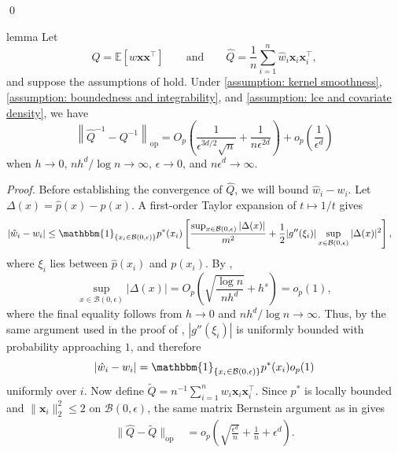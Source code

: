 \documentclass[11pt]{article}
\begin{document}
\begin{appendices}
\qed{}

\begin{restatable}{lemma}{}
    Let
    \[
        Q = \mathbb{E}\left[w\boldsymbol{x}\boldsymbol{x}^{\top}\right]
        \qquad\text{and}\qquad
        \hat{Q} = \frac{1}{n}\sum_{i = 1}^n\hat{w}_i\boldsymbol{x}_i\boldsymbol{x}_i^{\top},
    \]
    and suppose the assumptions of  hold. Under \cref{assumption: kernel smoothness}, \cref{assumption: boundedness and integrability}, and \cref{assumption: lce and covariate density}, we have 
    \[
        \left\|\hat{Q}^{-1} - Q^{-1}\right\|_{\operatorname{op}}
        =
        O_p\left(\frac{1}{\epsilon^{3d/2}\sqrt{n}} + \frac{1}{n\epsilon^{2d}}\right)
        + o_p\left(\frac{1}{\epsilon^d}\right)
    \]
    when $h\rightarrow0$, $nh^d/\log n\rightarrow\infty$, $\epsilon\rightarrow0$, and $n\epsilon^d\rightarrow\infty$.
    \label{lemma: Q convergence}
\end{restatable}
\noindent \textit{Proof.} Before establishing the convergence of $\hat Q$, we will bound $\hat w_i-w_i$. Let $\Delta(x)=\hat p(x)-p(x)$. A first-order Taylor expansion of $t\mapsto1/t$ gives
\begin{align*}
    |\hat{w}_i - w_i|
    &\leq \mathbbm{1}_{\{x_i \in \mathcal{B}(0, \epsilon)\}}p^*(x_i)
    \left[\frac{\sup_{x \in \mathcal{B}(0, \epsilon)}|\Delta(x)|}{m^2}
    + \frac{1}{2}|g''(\xi_i)|\sup_{x \in \mathcal{B}(0, \epsilon)}|\Delta(x)|^2\right],
\end{align*}
where $\xi_i$ lies between $\hat p(x_i)$ and $p(x_i)$. By ,
\[
    \sup_{x \in \mathcal{B}(0, \epsilon)}|\Delta(x)|
    =
    O_p\left(\sqrt{\frac{\log n}{nh^d}}+h^s\right)
    =
    o_p(1),
\]
where the final equality follows from $h\rightarrow0$ and $nh^d/\log n\rightarrow\infty$. Thus, by the same argument used in the proof of , $|g''(\xi_i)|$ is uniformly bounded with probability approaching $1$, and therefore
\[
    |\hat w_i-w_i|
    =
    \mathbbm{1}_{\{x_i\in\mathcal B(0,\epsilon)\}}p^*(x_i)o_p(1)
\]
uniformly over $i$. Now define $\tilde Q=n^{-1}\sum_{i=1}^nw_i\boldsymbol{x}_i\boldsymbol{x}_i^\top$. Since $p^*$ is locally bounded and $\|\boldsymbol{x}_i\|_2^2\leq2$ on $\mathcal B(0,\epsilon)$, the same matrix Bernstein argument as in  gives
\begin{align*}
    \|\hat Q-\tilde Q\|_{\operatorname{op}}
    &=
    o_p\left(\sqrt{\frac{\epsilon^d}{n}}+\frac{1}{n}+\epsilon^d\right).
\end{align*}

\end{appendices}
\end{document}

